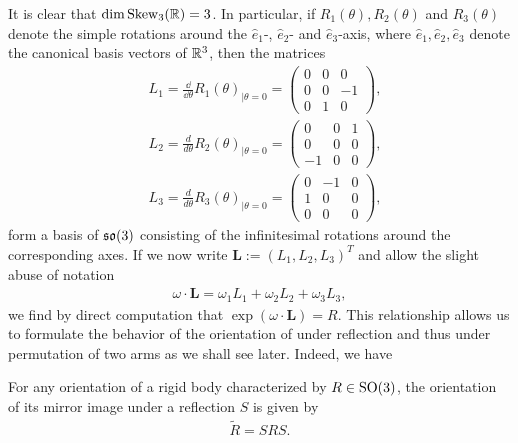 It is clear that $\dim \operatorname{Skew}_3(\mathbb{R}) = 3$. In particular, if $R_1(\theta), R_2(\theta)$ and $R_3(\theta)$ denote the simple rotations around the $\hat{e}_1$-, $\hat{e}_2$- and $\hat{e}_3$-axis, where $\hat{e}_1, \hat{e}_2, \hat{e}_3$ denote the canonical basis vectors of $\mathbb{R}^3$, then the matrices
\begin{align}
\label{eq: L1}
	&L_1 = \frac{\dd}{\dd\theta}R_1(\theta)_{\mid \theta =0} = \left(\begin{array}{ccc}
	0 & 0 & 0 \\ 
	0 & 0 & -1 \\ 
	0 & 1 & 0
	\end{array}  \right ),\\
\label{eq: L2}
	&L_2 = \frac{d}{d\theta}R_2(\theta)_{\mid \theta =0} = \left (\begin{array}{ccc}
	0 & 0 & 1 \\ 
	0 & 0 & 0 \\ 
	-1 & 0 & 0
	\end{array}  \right ),\\
\label{eq: L3}
	&L_3 = \frac{d}{d\theta}R_3(\theta)_{\mid \theta =0} = \left (\begin{array}{ccc}
	0 & -1 & 0 \\ 
	1 & 0 & 0 \\ 
	0 & 0 & 0
	\end{array}  \right ),
\end{align}
form a basis of $\mathfrak{so}(3)$ consisting of the infinitesimal rotations around the corresponding axes. If we now write $\textbf{L} := (L_1, L_2, L_3)^T$ and allow the slight abuse of notation
\begin{align}
	\omega \cdot \mathbf{L} = \omega_1 L_1 + \omega_2 L_2 + \omega_3 L_3,
\end{align}
we find by direct computation that $\exp(\omega \cdot \mathbf{L}) = R$. This relationship allows us to formulate the behavior of the orientation of \spr under reflection and thus under permutation of two arms as we shall see later. Indeed, we have

\begin{lemma}
For any orientation of a rigid body characterized by $R \in \operatorname{SO}(3)$, the orientation of its mirror image under a reflection $S$ is given by
\begin{align}
	\tilde{R} = S R S.
\end{align}
\end{lemma}

